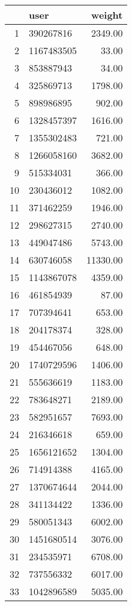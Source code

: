\begin{table}[ht]
\centering
\begin{tabular}{rlr}
  \hline
 & user & weight \\ 
  \hline
1 & 390267816 & 2349.00 \\ 
  2 & 1167483505 & 33.00 \\ 
  3 & 853887943 & 34.00 \\ 
  4 & 325869713 & 1798.00 \\ 
  5 & 898986895 & 902.00 \\ 
  6 & 1328457397 & 1616.00 \\ 
  7 & 1355302483 & 721.00 \\ 
  8 & 1266058160 & 3682.00 \\ 
  9 & 515334031 & 366.00 \\ 
  10 & 230436012 & 1082.00 \\ 
  11 & 371462259 & 1946.00 \\ 
  12 & 298627315 & 2740.00 \\ 
  13 & 449047486 & 5743.00 \\ 
  14 & 630746058 & 11330.00 \\ 
  15 & 1143867078 & 4359.00 \\ 
  16 & 461854939 & 87.00 \\ 
  17 & 707394641 & 653.00 \\ 
  18 & 204178374 & 328.00 \\ 
  19 & 454467056 & 648.00 \\ 
  20 & 1740729596 & 1406.00 \\ 
  21 & 555636619 & 1183.00 \\ 
  22 & 783648271 & 2189.00 \\ 
  23 & 582951657 & 7693.00 \\ 
  24 & 216346618 & 659.00 \\ 
  25 & 1656121652 & 1304.00 \\ 
  26 & 714914388 & 4165.00 \\ 
  27 & 1370674644 & 2044.00 \\ 
  28 & 341134422 & 1336.00 \\ 
  29 & 580051343 & 6002.00 \\ 
  30 & 1451680514 & 3076.00 \\ 
  31 & 234535971 & 6708.00 \\ 
  32 & 737556332 & 6017.00 \\ 
  33 & 1042896589 & 5035.00 \\ 

\end{tabular}
\end{table}
